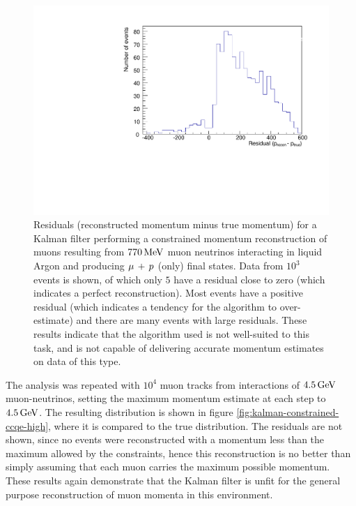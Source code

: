 \begin{figure}
    \centering
    \includegraphics[angle=-90,width=\textwidth]{chapters/trackfitting_images/kalman-ccqe-low-constrained-residuals}
    \caption[Residuals for constrained momentum reconstruction at $E_\nu = 770\MeV$]{\label{fig:kalman-constrained-ccqe-770-residuals}Residuals (reconstructed momentum minus true momentum) for a Kalman filter performing a constrained momentum reconstruction of muons resulting from $770\,\mathrm{MeV}$ muon neutrinos interacting in liquid Argon and producing $\mu\,+\,p$ (only) final states. Data from $10^3$ events is shown, of which only $5$ have a residual close to zero (which indicates a perfect reconstruction). Most events have a positive residual (which indicates a tendency for the algorithm to over-estimate) and there are many events with large residuals. These results indicate that the algorithm used is not well-suited to this task, and is not capable of delivering accurate momentum estimates on data of this type.}
\end{figure}

The analysis was repeated with $10^4$ muon tracks from interactions of $4.5\,\mathrm{GeV}$ muon-neutrinos, setting the maximum momentum estimate at each step to $4.5\,\mathrm{GeV}$. The resulting distribution is shown in figure \ref{fig:kalman-constrained-ccqe-high}, where it is compared to the true distribution. The residuals are not shown, since no events were reconstructed with a momentum less than the maximum allowed by the constraints, hence this reconstruction is no better than simply assuming that each muon carries the maximum possible momentum. These results again demonstrate that the Kalman filter is unfit for the general purpose reconstruction of muon momenta in this environment.

